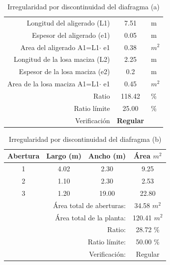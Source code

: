 \documentclass{article}%
\begin{document}
\begin{table}[H]%
\centering%
\caption{Irregularidad por discontinuidad del diafragma (a)}%
\begin{tabular}{llcr}%
\cline{1-3}%
\multicolumn{2}{r}{Longitud del aligerado (L1)} & 7.51 & \multicolumn{1}{l}{m} \\%
\multicolumn{2}{r}{Espesor del aligerado (e1)} & 0.05 & \multicolumn{1}{l}{m} \\%
\multicolumn{2}{r}{Area del aligerado A1=L1$\cdot$ e1} & 0.38 & \multicolumn{1}{l}{$m^2$} \\%
\multicolumn{2}{r}{Longitud de la losa maciza (L2)} & 2.25 & \multicolumn{1}{l}{m} \\%
\multicolumn{2}{r}{Espesor de la losa maciza (e2)} & 0.2 & \multicolumn{1}{l}{m} \\%
\multicolumn{2}{r}{Area de la losa maciza A1=L1$\cdot$ e1} & 0.45 & \multicolumn{1}{l}{$m^2$} \\%
\multicolumn{2}{r}{Ratio} & 118.42 & \multicolumn{1}{l}{\%} \\%
\multicolumn{2}{r}{Ratio límite} & 25.00 & \multicolumn{1}{l}{\%} \\%
\multicolumn{2}{r}{Verificación} & \textcolor[rgb]{ .267,  .447,  .769}{\textbf{Regular}} & \multicolumn{1}{l}{} \\%
\cline{1-3}%
\end{tabular}%
\end{table}

%
\vspace{-15pt}%


\begin{table}[H]%
\centering%
\caption{Irregularidad por discontinuidad del diafragma (b)}%
\begin{tabular}{cccc}%
\hline%
\textbf{Abertura}&\textbf{Largo (m)}&\textbf{Ancho (m)}&\textbf{Área $m^2$}\\%
\hline%
1&4.02&2.30&9.25\\%
\hline%
2&1.10&2.30&2.53\\%
\hline%
3&1.20&19.00&22.80\\%
\hline%
&\multicolumn{2}{r}{Área total de aberturas:}&34.58 $m^2$\\%
&\multicolumn{2}{r}{Área total de la planta:}&120.41 $m^2$\\%
&\multicolumn{2}{r}{Ratio:}&28.72 \%\\%
&\multicolumn{2}{r}{Ratio límite:}&50.00 \%\\%
&\multicolumn{2}{r}{Verificación:}&\textcolor[rgb]{ .267,  .447,  .769} {Regular}\\%
\end{tabular}%
\end{table}
\end{document}
